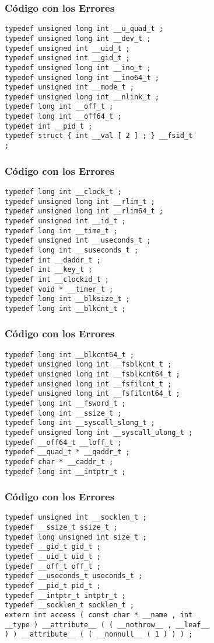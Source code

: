 \documentclass{beamer}
\begin{document}
\begin{frame}[fragile]
\frametitle{C\'odigo con los Errores}
\begin{verbatim}
typedef unsigned long int __u_quad_t ; 
typedef unsigned long int __dev_t ; 
typedef unsigned int __uid_t ; 
typedef unsigned int __gid_t ; 
typedef unsigned long int __ino_t ; 
typedef unsigned long int __ino64_t ; 
typedef unsigned int __mode_t ; 
typedef unsigned long int __nlink_t ; 
typedef long int __off_t ; 
typedef long int __off64_t ; 
typedef int __pid_t ; 
typedef struct { int __val [ 2 ] ; } __fsid_t 
; 
\end{verbatim}
\end{frame}
\begin{frame}[fragile]
\frametitle{C\'odigo con los Errores}
\begin{verbatim}
typedef long int __clock_t ; 
typedef unsigned long int __rlim_t ; 
typedef unsigned long int __rlim64_t ; 
typedef unsigned int __id_t ; 
typedef long int __time_t ; 
typedef unsigned int __useconds_t ; 
typedef long int __suseconds_t ; 
typedef int __daddr_t ; 
typedef int __key_t ; 
typedef int __clockid_t ; 
typedef void * __timer_t ; 
typedef long int __blksize_t ; 
typedef long int __blkcnt_t ; 
\end{verbatim}
\end{frame}
\begin{frame}[fragile]
\frametitle{C\'odigo con los Errores}
\begin{verbatim}
typedef long int __blkcnt64_t ; 
typedef unsigned long int __fsblkcnt_t ; 
typedef unsigned long int __fsblkcnt64_t ; 
typedef unsigned long int __fsfilcnt_t ; 
typedef unsigned long int __fsfilcnt64_t ; 
typedef long int __fsword_t ; 
typedef long int __ssize_t ; 
typedef long int __syscall_slong_t ; 
typedef unsigned long int __syscall_ulong_t ; 
typedef __off64_t __loff_t ; 
typedef __quad_t * __qaddr_t ; 
typedef char * __caddr_t ; 
typedef long int __intptr_t ; 
\end{verbatim}
\end{frame}
\begin{frame}[fragile]
\frametitle{C\'odigo con los Errores}
\begin{verbatim}
typedef unsigned int __socklen_t ; 
typedef __ssize_t ssize_t ; 
typedef long unsigned int size_t ; 
typedef __gid_t gid_t ; 
typedef __uid_t uid_t ; 
typedef __off_t off_t ; 
typedef __useconds_t useconds_t ; 
typedef __pid_t pid_t ; 
typedef __intptr_t intptr_t ; 
typedef __socklen_t socklen_t ; 
extern int access ( const char * __name , int 
__type ) __attribute__ ( ( __nothrow__ , __leaf__ 
) ) __attribute__ ( ( __nonnull__ ( 1 ) ) ) ; 
\end{verbatim}
\end{frame}
\end{document}
